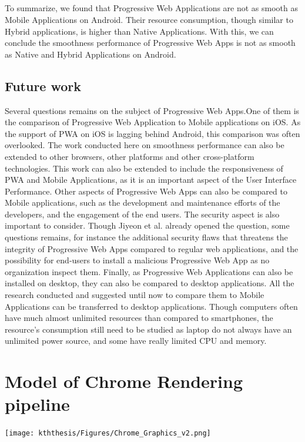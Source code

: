 \documentclass{kththesis}
\begin{document}
\paragraph{}
To summarize, we found that Progressive Web Applications are not as smooth as Mobile Applications on Android. Their resource consumption, though similar to Hybrid applications, is higher than Native Applications. With this, we can conclude the smoothness performance of Progressive Web Apps is not as smooth as Native and Hybrid Applications on Android. 

\section{Future work}
Several questions remains on the subject of Progressive Web Apps.One of them is the comparison of Progressive Web Application to Mobile applications on iOS. As the support of PWA on iOS is lagging behind Android, this comparison was often overlooked. \newline
The work conducted here on smoothness performance can also be extended to other browsers, other platforms and other cross-platform technologies. This work can also be extended to include the responsiveness of PWA and Mobile Applications, as it is an important aspect of the User Interface Performance. \newline
Other aspects of Progressive Web Apps can also be compared to Mobile applications, such as the development and maintenance efforts of the developers, and the engagement of the end users. \newline
The security aspect is also important to consider. Though Jiyeon et al. \cite{Pride_Prejudice} already opened the question, some questions remains, for instance the additional security flaws that threatens the integrity of Progressive Web Apps compared to regular web applications, and the possibility for end-users to install a malicious Progressive Web App as no organization inspect them.
Finally, as Progressive Web Applications can also be installed on desktop, they can also be compared to desktop applications. All the research conducted and suggested until now to compare them to Mobile Applications can be transferred to desktop applications. Though computers often have much almost unlimited resources than compared to smartphones, the resource's consumption still need to be studied as laptop do not always have an unlimited power source, and some have really limited CPU and memory. 



\listoffigures
\printbibliography[heading=bibintoc]

\appendix
    \chapter{Model of Chrome Rendering pipeline}
    \label{annex:chrome_model}
    
    \begin{center}
        \texttt{[image: kththesis/Figures/Chrome\_Graphics\_v2.png]}
    \end{center}


\tailmatter
\end{document}
